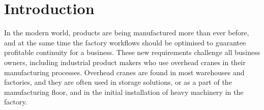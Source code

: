 \documentclass[12pt,a4paper,oneside,pdftex]{report}
\begin{document}


\chapter{Introduction}
\label{chapter:introduction}

In the modern world, products are being manufactured more than ever before, and at the same time the factory workflows should be optimised to guarantee profitable continuity for a business. These new requirements challenge all business owners, including industrial product makers who use overhead cranes in their manufacturing processes. Overhead cranes are found in most warehouses and factories, and they are often used in storage solutions, or as a part of the manufacturing floor, and in the initial installation of heavy machinery in the factory.
\end{document}
